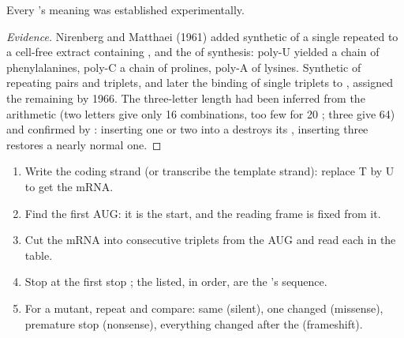 \begin{proposition}\label{prop:g11:gene-expression:readcode}
Every 's meaning was established experimentally.
\end{proposition}
\begin{proof}[Evidence]
Nirenberg and Matthaei (1961) added synthetic  of a single repeated
 to a cell-free extract containing , 
and the  of  synthesis: poly-U yielded a chain of
phenylalanines, poly-C a chain of prolines, poly-A of lysines.
Synthetic  of repeating pairs and triplets, and later the binding
of single triplets to , assigned the remaining  by
1966. The three-letter length had been inferred from the arithmetic
(two letters give only 16 combinations, too few for 20 ;
three give 64) and confirmed by : inserting one or two
 into a  destroys its , inserting three
restores a nearly normal one.
\end{proof}

\begin{method}\label{met:g11:gene-expression:translate}
\begin{enumerate}
  \item Write the coding strand (or transcribe the template strand):
        replace T by U to get the mRNA.
  \item Find the first AUG: it is the start, and the reading frame is
        fixed from it.
  \item Cut the mRNA into consecutive triplets from the AUG and read
        each in the table.
  \item Stop at the first stop ; the  listed, in
        order, are the 's sequence.
  \item For a mutant, repeat and compare: same  (silent), one
         changed (missense), premature stop (nonsense),
        everything changed after the  (frameshift).
\end{enumerate}
\end{method}

